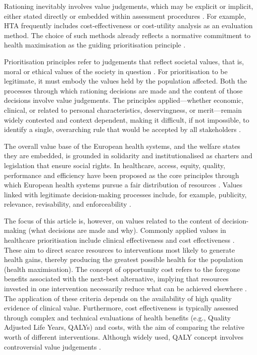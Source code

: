 \documentclass[11pt]{article}\usepackage[]{graphicx}\usepackage[]{xcolor}
\begin{document}
Rationing inevitably involves value judgements, which may be explicit or implicit, either stated directly or embedded within assessment procedures \parencite{ClarkWeale2012SocialValuesPrioritySetting}. For example, HTA frequently includes cost-effectiveness or cost-utility analysis as an evaluation method. The choice of such methods already reflects a normative commitment to health maximisation as the guiding prioritisation principle \parencite{Jansen2016,DanielsVanDerWilt2016HTADeliberative}.

Prioritisation principles refer to judgements that reflect societal values, that is, moral or ethical values of the society in question \parencite{ClarkWeale2012SocialValuesPrioritySetting}. For prioritisation to be legitimate, it must embody the values held by the population affected. Both the processes through which rationing decisions are made and the content of those decisions involve value judgements. The principles applied---whether economic, clinical, or related to personal characteristics, deservingness, or merit---remain widely contested and context dependent, making it difficult, if not impossible, to identify a single, overarching rule that would be accepted by all stakeholders \parencite{Oliver2009FairTestFairInnings, Watters2016FairInningsEmpiricalPerspective}.

The overall value base of the European health systems, and the welfare states they are embedded, is grounded in solidarity and institutionalised as charters and legislation that ensure social rights. In healthcare, access, equity, quality, performance and efficiency have been proposed as the core principles through which European health systems pursue a fair distribution of resources \parencite{EuropeanCommission2019DefiningValueVBHC}. Values linked with legitimate decision-making processes include, for example, publicity, relevance, revisability, and enforceability \parencite{Daniels2000AccountabilityReasonableness, DanielsVanDerWilt2016HTADeliberative}.

The focus of this article is, however, on values related to the content of decision-making (what decisions are made and why). Commonly applied values in healthcare prioritisation include clinical effectiveness and cost effectiveness \parencite{ClarkWeale2012SocialValuesPrioritySetting}. These aim to direct scarce resources to interventions most likely to generate health gains, thereby producing the greatest possible health for the population (health maximisation). The concept of opportunity cost refers to the foregone benefits associated with the next-best alternative, implying that resources invested in one intervention necessarily reduce what can be achieved elsewhere \parencite{Maguire2023}. The application of these criteria depends on the availability of high quality evidence of clinical value. Furthermore, cost effectiveness is typically assessed through complex and technical evaluations of health benefits (e.g., Quality Adjusted Life Years, QALYs) and costs, with the aim of comparing the relative worth of different interventions. Although widely used, QALY concept involves controversial value judgements \parencite{Dukhanin2018IntegratingSocialJustice, Mahdiani2024QALYStillQALY, Andrade2025EthicalShortcomingsQALY}.
\end{document}
